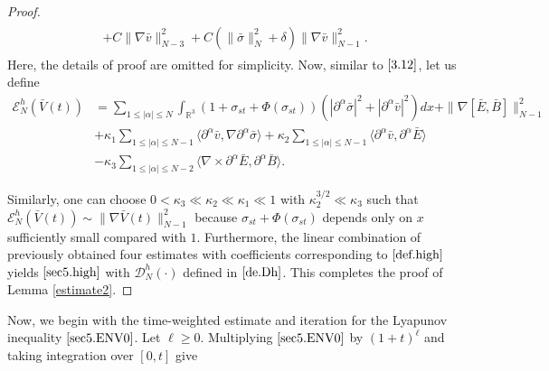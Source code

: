 \documentclass[11pt]{amsart}
\numberwithin{equation}{section}
\begin{document}
\begin{proof}
\begin{eqnarray*}
\begin{aligned}
   +C\|\nabla\bar{v}\|_{N-3}^2+C(\|\bar{\sigma}\|_{N}^{2}+\delta)\|\nabla \bar{v}\|_{N-1}^{2}.
\end{aligned}
\end{eqnarray*}
Here, the details of proof are omitted for simplicity. Now, similar
to $\eqref{3.12}$, let us define
\begin{equation}\label{def.high}
\begin{aligned}
\mathcal{E}_{N}^{h}(\bar{V}(t))&=\sum_{1\leq|\alpha|\leq
N}\int_{\mathbb{R}^3}(1+\sigma_{st}+\Phi(\sigma_{st}))
(|\partial^{\alpha}\bar{\sigma}|^2+|\partial^{\alpha}\bar{v}|^2)dx+\|\nabla[\bar{E},\bar{B}]\|_{N-1}^{2}\\
&+\kappa_{1}\sum_{1\leq|\alpha|\leq N-1}\langle
\partial^{\alpha}\bar{v},\nabla\partial^{\alpha}\bar{\sigma}\rangle+\kappa_{2}\sum_{1\leq|\alpha|\leq N-1}\langle
\partial^{\alpha}\bar{v},\partial^{\alpha}\bar{E}\rangle\\[3mm]
&-\kappa_{3}\sum_{1\leq |\alpha|\leq N-2}\langle \nabla
   \times\partial^{\alpha}\bar{E},\partial^{\alpha}\bar{B}\rangle.
\end{aligned}
\end{equation}

Similarly, one can choose $0<\kappa_{3}\ll\kappa_{2}\ll\kappa_{1}\ll
1$ with $\kappa_{2}^{3/2}\ll\kappa_{3}$ such that $\mathcal
{E}_{N}^{h}(\bar{V}(t))\sim \|\nabla \bar{V}(t)\|_{N-1}^{2}$ because
$\sigma_{st}+\Phi(\sigma_{st}) $ depends only on $ x$ sufficiently
small compared with $1$. Furthermore, the linear combination of
previously obtained four estimates with coefficients corresponding
to $\eqref{def.high}$ yields $\eqref{sec5.high}$ with $\mathcal
{D}_{N}^{h}(\cdot)$ defined in $\eqref{de.Dh}$. This completes the
proof of Lemma \ref{estimate2}.
\end{proof}

Now, we begin with the time-weighted estimate and iteration for the
Lyapunov inequality $\eqref{sec5.ENV0}$. Let $\ell \geq 0$.
Multiplying $\eqref{sec5.ENV0}$ by $(1+t)^{\ell}$ and taking
integration over $[0,t]$ give
\end{document}
